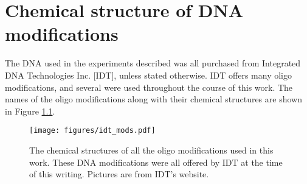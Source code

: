 \chapter{Chemical structure of DNA modifications}
\label{idt_dna}

The DNA used in the experiments described was all purchased from Integrated DNA Technologies Inc. [IDT], unless stated otherwise.  IDT offers many oligo modifications, and several were used throughout the course of this work.  The names of the oligo modifications along with their chemical structures are shown in Figure \ref{fig:idt_mods}.

\begin{figure}[h]
\begin{centering}
\texttt{[image: figures/idt\_mods.pdf]}
\caption[Oligo modifications used in this work]{The chemical structures of all the oligo modifications used in this work.  These DNA modifications were all offered by IDT at the time of this writing.  Pictures are from IDT's website.}
\label{fig:idt_mods}
\end{centering}
\end{figure}